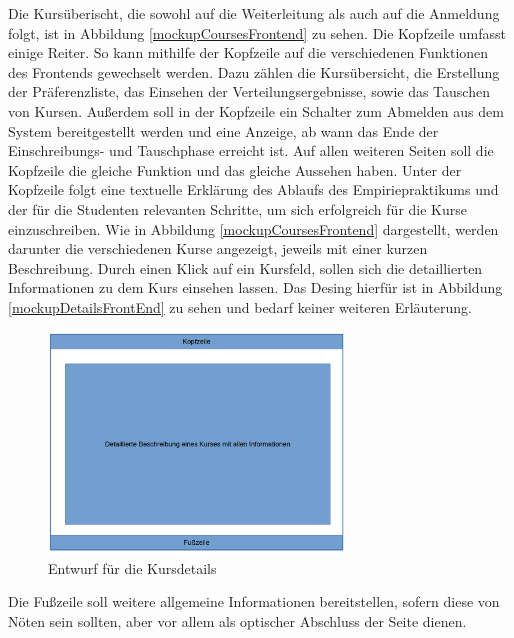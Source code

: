             Die Kursüberischt, die sowohl auf die Weiterleitung als auch auf die Anmeldung folgt, ist in Abbildung \ref{mockupCoursesFrontend} zu sehen.
            Die Kopfzeile umfasst einige Reiter.
            So kann mithilfe der Kopfzeile auf die verschiedenen Funktionen des Frontends gewechselt werden. 
            Dazu zählen die Kursübersicht, die Erstellung der Präferenzliste, das Einsehen der Verteilungsergebnisse, sowie das Tauschen von Kursen.
            Außerdem soll in der Kopfzeile ein Schalter zum Abmelden aus dem System bereitgestellt werden und eine Anzeige, ab wann das Ende der Einschreibungs- und Tauschphase erreicht ist.
            Auf allen weiteren Seiten soll die Kopfzeile die gleiche Funktion und das gleiche Aussehen haben.
            Unter der Kopfzeile folgt eine textuelle Erklärung des Ablaufs des Empiriepraktikums und der für die Studenten relevanten Schritte, um sich erfolgreich für die Kurse einzuschreiben.
            Wie in Abbildung \ref{mockupCoursesFrontend} dargestellt, werden darunter die verschiedenen Kurse angezeigt, jeweils mit einer kurzen Beschreibung.
            Durch einen Klick auf ein Kursfeld, sollen sich die detaillierten Informationen zu dem Kurs einsehen lassen.
            Das Desing hierfür ist in Abbildung \ref{mockupDetailsFrontEnd} zu sehen und bedarf keiner weiteren Erläuterung.
            \begin{figure}[t]
            	\centering
            	\includegraphics[width=0.7\textwidth]{./design/MockUpsFrontend/kursdetails.png}
            	\caption{Entwurf für die Kursdetails}
            	\label{mockupDetailsFrontend}
            \end{figure}
            Die Fußzeile soll weitere allgemeine Informationen bereitstellen, sofern diese von Nöten sein sollten, aber vor allem als optischer Abschluss der Seite dienen.
